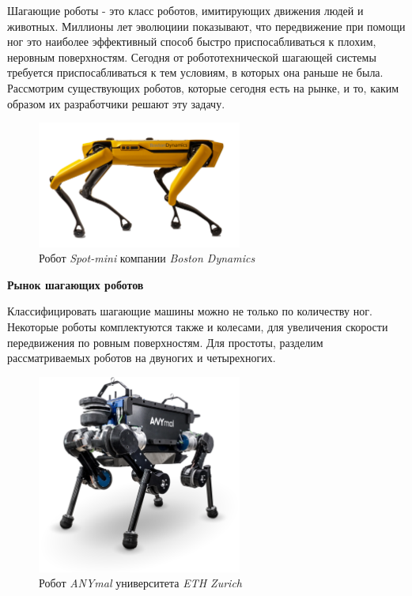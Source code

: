 
Шагающие роботы - это класс роботов, имитирующих движения людей и животных. Миллионы лет эволюциии показывают, что передвижение при помощи ног это наиболее эффективный способ быстро приспосабливаться к плохим, неровным поверхностям. Сегодня от робототехнической шагающей системы требуется приспосабливаться к тем условиям, в которых она раньше не была. Рассмотрим существующих роботов, которые сегодня есть на рынке, и то, каким образом их разработчики решают эту задачу.

\begin{figure}[h]
    \centering
    \includegraphics[width=0.6\textwidth]{chapter_intro/figure1.png}
    \caption{Робот \textit{Spot-mini} компании \textit{Boston Dynamics}}
    \label{fig:intro1}
\end{figure}

\textbf{Рынок шагающих роботов}

Классифицировать шагающие машины можно не только по количеству ног. Некоторые роботы комплектуются также и колесами, для увеличения скорости передвижения по ровным поверхностям. Для простоты, разделим рассматриваемых роботов на двуногих и четырехногих. 

\begin{figure}[h]
    \centering
    \includegraphics[width=0.6\textwidth]{chapter_intro/figure2.png}
    \caption{Робот \textit{ANYmal} университета \textit{ ETH Zurich}}
    \label{fig:intro2}
\end{figure}

